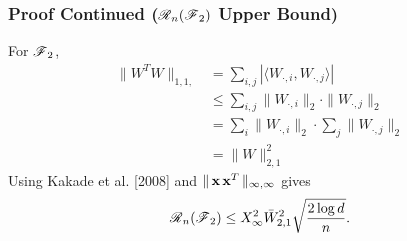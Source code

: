 \begin{frame}
\frametitle{Proof Continued ($\operatorname{\mathscr{R}}_n(\operatorname{\mathscr{F}}_2)$ Upper Bound)}
For $\operatorname{\mathscr{F}}_2$,
\begin{align*}
\|W^TW\|_{1,1,} &= \sum_{i,j} |\langle W_{\cdot,i},   W_{\cdot,j}\rangle| \\
  &\le \sum_{i,j} \|W_{\cdot,i}\|_2 \cdot \|W_{\cdot,j}\|_2 \\
  &= \sum_i \|W_{\cdot,i}\|_2 \cdot \sum_j \|W_{\cdot,j}\|_2 \\
  &= \|W\|_{2,1}^2
\end{align*}
Using Kakade et al. [2008] and $\|\operatorname{\mathbf{x}}\operatorname{\mathbf{x}}^T\|_{\infty,\infty}$ gives
\[\operatorname{\mathscr{R}}_n(\operatorname{\mathscr{F}}_2) \le X_\infty^2 \bar{W}_{2,1}^2 \sqrt{\frac{2\log d}{n}}.\]
\end{frame}


